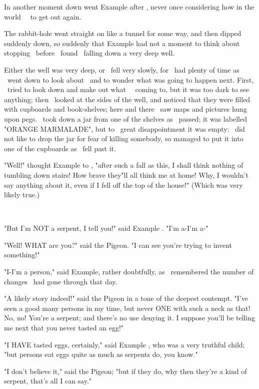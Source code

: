 \documentclass{article}
\begin{document}
\set
In another moment down went  Example  after \them[2], never once considering how in the world \they\ \were\ to get out again.

\set
The rabbit-hole went straight on like a tunnel for some way, and then dipped suddenly down, so suddenly that  Example  had not a moment to think about stopping \themself\ before \they\ found \themself\ falling down a very deep well.

\set
Either the well was very deep, or \they\ fell very slowly, for \they\ had plenty of time as \they\ went down to look about \them\ and to wonder what was going to happen next. First, \they\ tried to look down and make out what \they\ \were\ coming to, but it was too dark to see anything; then \they\ looked at the sides of the well, and noticed that they were filled with cupboards and book-shelves; here and there \they\ saw maps and pictures hung upon pegs. \they\ took down a jar from one of the shelves as \they\ passed; it was labelled "ORANGE MARMALADE", but to \their\ great disappointment it was empty: \they\ did not like to drop the jar for fear of killing somebody, so managed to put it into one of the cupboards as \they\ fell past it.

\set
"Well!" thought  Example  to \themself, "after such a fall as this, I shall think nothing of tumbling down stairs! How brave they"ll all think me at home! Why, I wouldn't say anything about it, even if I fell off the top of the house!" (Which was very likely true.)

~

"But I'm NOT a serpent, I tell you!" said  Example . "I'm a-I'm a-"

"Well! WHAT are you?" said the Pigeon. "I can see you're trying to invent something!"

\set
"I-I'm a person," said  Example, rather doubtfully, as \they\ remembered the number of changes \they\ had gone through that day.

"A likely story indeed!" said the Pigeon in a tone of the deepest contempt. "I've seen a good many persons in my time, but never ONE with such a neck as that! No, no! You're a serpent; and there's no use denying it. I suppose you'll be telling me next that you never tasted an egg!"

"I HAVE tasted eggs, certainly," said  Example , who was a very truthful child; "but persons eat eggs quite as much as serpents do, you know."

\set
"I don't believe it," said the Pigeon; "but if they do, why then they're a kind of serpent, that's all I can say."
\end{document}
